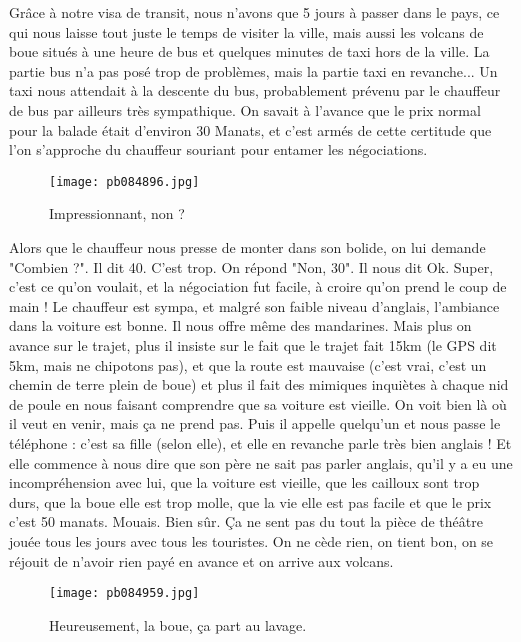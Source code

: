 \documentclass{book}
\begin{document}
Grâce à notre visa de transit, nous n'avons que 5 jours à passer dans le pays, ce qui nous laisse tout juste le temps de visiter la ville, mais aussi les volcans de boue situés à une heure de bus et quelques minutes de taxi hors de la ville. La partie bus n'a pas posé trop de problèmes, mais la partie taxi en revanche... Un taxi nous attendait à la descente du bus, probablement prévenu par le chauffeur de bus par ailleurs très sympathique. On savait à l'avance que le prix normal pour la balade était d'environ 30 Manats, et c'est armés de cette certitude que l'on s'approche du chauffeur souriant pour entamer les négociations.


\begin{figure}[h]
\centering
\texttt{[image: pb084896.jpg]}
\caption*{Impressionnant, non ?}
\end{figure}

Alors que le chauffeur nous presse de monter dans son bolide, on lui demande "Combien ?". Il dit 40. C'est trop. On répond "Non, 30". Il nous dit Ok. Super, c'est ce qu'on voulait, et la négociation fut facile, à croire qu'on prend le coup de main ! Le chauffeur est sympa, et malgré son faible niveau d'anglais, l'ambiance dans la voiture est bonne. Il nous offre même des mandarines. Mais plus on avance sur le trajet, plus il insiste sur le fait que le trajet fait 15km (le GPS dit 5km, mais ne chipotons pas), et que la route est mauvaise (c'est vrai, c'est un chemin de terre plein de boue) et plus il fait des mimiques inquiètes à chaque nid de poule en nous faisant comprendre que sa voiture est vieille. On voit bien là où il veut en venir, mais ça ne prend pas. Puis il appelle quelqu'un et nous passe le téléphone : c'est sa fille (selon elle), et elle en revanche parle très bien anglais ! Et elle commence à nous dire que son père ne sait pas parler anglais, qu'il y a eu une incompréhension avec lui, que la voiture est vieille, que les cailloux sont trop durs, que la boue elle est trop molle, que la vie elle est pas facile et que le prix c'est 50 manats. Mouais. Bien sûr. Ça ne sent pas du tout la pièce de théâtre jouée tous les jours avec tous les touristes. On ne cède rien, on tient bon, on se réjouit de n'avoir rien payé en avance et on arrive aux volcans.


\begin{figure}[h]
\centering
\texttt{[image: pb084959.jpg]}
\caption*{Heureusement, la boue, ça part au lavage.}
\end{figure}
\end{document}
